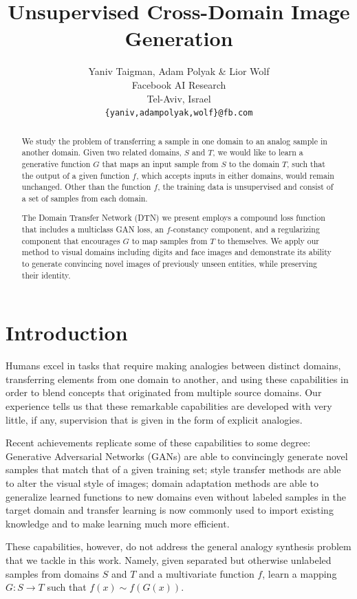\documentclass{article} %
\title{Unsupervised Cross-Domain Image Generation}
\author{Yaniv Taigman, Adam Polyak \& Lior Wolf\\
Facebook AI Research\\
Tel-Aviv, Israel \\
\texttt{\{yaniv,adampolyak,wolf\}@fb.com} \\
}
\begin{document}
\maketitle

\begin{abstract}
We study the problem of transferring a sample in one domain to an analog sample in another domain. Given two related domains, $S$ and $T$, we would like to learn a generative function $G$ that maps an input sample from $S$ to the domain $T$, such that the output of a given function $f$, which accepts inputs in either domains, would remain unchanged. Other than the function $f$, the training data is unsupervised and consist of a set of samples from each domain.

The Domain Transfer Network (DTN) we present employs a compound loss function that includes a multiclass GAN loss, an $f$-constancy component, and a regularizing component that encourages $G$ to map samples from $T$ to themselves. We apply our method to visual domains including digits and face images and demonstrate its ability to generate convincing novel images of previously unseen entities, while preserving their identity. 

\end{abstract}

\section{Introduction}

Humans excel in tasks that require making analogies between distinct domains, transferring elements from one domain to another, and using these capabilities in order to blend concepts that originated from multiple source domains. Our experience tells us that these remarkable capabilities are developed with very little, if any, supervision that is given in the form of explicit analogies.

Recent achievements replicate some of these capabilities to some degree: Generative Adversarial Networks (GANs) are able to convincingly generate novel samples that match that of a given training set; style transfer methods are able to alter the visual style of images; domain adaptation methods are able to generalize learned functions to new domains even without labeled samples in the target domain and transfer learning is now commonly used to import existing knowledge and to make learning much more efficient. 

These capabilities, however, do not address the general analogy synthesis problem that we tackle in this work. Namely, given separated but otherwise unlabeled samples from domains $S$ and $T$ and a multivariate function $f$, learn a mapping $G:S\rightarrow T$ such that $f(x) \sim f(G(x))$. 
\end{document}
